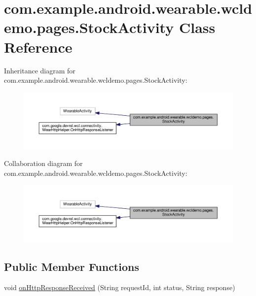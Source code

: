 \hypertarget{classcom_1_1example_1_1android_1_1wearable_1_1wcldemo_1_1pages_1_1StockActivity}{}\section{com.\+example.\+android.\+wearable.\+wcldemo.\+pages.\+Stock\+Activity Class Reference}
\label{classcom_1_1example_1_1android_1_1wearable_1_1wcldemo_1_1pages_1_1StockActivity}


Inheritance diagram for com.\+example.\+android.\+wearable.\+wcldemo.\+pages.\+Stock\+Activity\+:
\nopagebreak
\begin{figure}[H]
\begin{center}
\leavevmode
\includegraphics[width=350pt]{da/d0b/classcom_1_1example_1_1android_1_1wearable_1_1wcldemo_1_1pages_1_1StockActivity__inherit__graph}
\end{center}
\end{figure}


Collaboration diagram for com.\+example.\+android.\+wearable.\+wcldemo.\+pages.\+Stock\+Activity\+:
\nopagebreak
\begin{figure}[H]
\begin{center}
\leavevmode
\includegraphics[width=350pt]{df/dc2/classcom_1_1example_1_1android_1_1wearable_1_1wcldemo_1_1pages_1_1StockActivity__coll__graph}
\end{center}
\end{figure}
\subsection*{Public Member Functions}
\begin{DoxyCompactItemize}
\item 
void \hyperlink{classcom_1_1example_1_1android_1_1wearable_1_1wcldemo_1_1pages_1_1StockActivity_a175b9ab0505f9c4dfb8b1f4928e96271}{on\+Http\+Response\+Received} (String request\+Id, int status, String response)
\end{DoxyCompactItemize}

